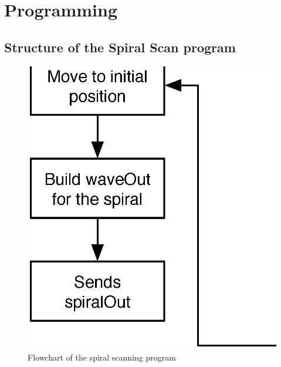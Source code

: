 
\appendix
\chapter{Programming}

\section{Structure of the Spiral Scan program}

\begin{figure}[H]
  \centering
  \includegraphics[scale=0.5]{images/generalprogramflowchart.eps}
    \caption{Flowchart of the spiral scanning program}
  \label{generalprogramflowchart}
\end{figure}
